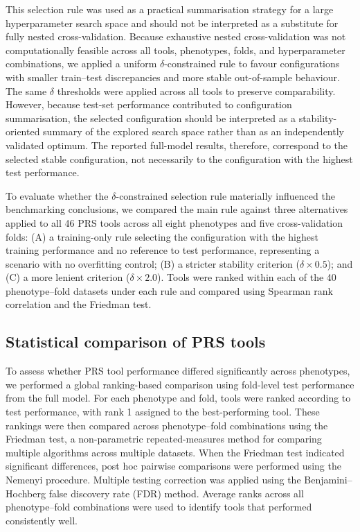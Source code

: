 \documentclass[pdflatex,sn-basic]{sn-jnl}
\begin{document}
This selection rule was used as a practical summarisation strategy for a large hyperparameter search space and should not be interpreted as a substitute for fully nested cross-validation. Because exhaustive nested cross-validation was not computationally feasible across all tools, phenotypes, folds, and hyperparameter combinations, we applied a uniform $\delta$-constrained rule to favour configurations with smaller train--test discrepancies and more stable out-of-sample behaviour. The same $\delta$ thresholds were applied across all tools to preserve comparability. However, because test-set performance contributed to configuration summarisation, the selected configuration should be interpreted as a stability-oriented summary of the explored search space rather than as an independently validated optimum. The reported full-model results, therefore, correspond to the selected stable configuration, not necessarily to the configuration with the highest test performance. 

To evaluate whether the $\delta$-constrained selection rule materially influenced the benchmarking conclusions, we compared the main rule against three alternatives applied to all 46 PRS tools across all eight phenotypes and five cross-validation folds: (A) a training-only rule selecting the configuration with the highest training performance and no reference to test performance, representing a scenario with no overfitting control; (B) a stricter stability criterion ($\delta \times 0.5$); and (C) a more lenient criterion ($\delta \times 2.0$). Tools were ranked within each of the 40 phenotype--fold datasets under each rule and compared using Spearman rank correlation and the Friedman test.


\subsection*{Statistical comparison of PRS tools}

To assess whether PRS tool performance differed significantly across phenotypes, we performed a global ranking-based comparison using fold-level test performance from the full model. For each phenotype and fold, tools were ranked according to test performance, with rank 1 assigned to the best-performing tool. These rankings were then compared across phenotype--fold combinations using the Friedman test, a non-parametric repeated-measures method for comparing multiple algorithms across multiple datasets. When the Friedman test indicated significant differences, post hoc pairwise comparisons were performed using the Nemenyi procedure. Multiple testing correction was applied using the Benjamini--Hochberg false discovery rate (FDR) method. Average ranks across all phenotype--fold combinations were used to identify tools that performed consistently well. 
\end{document}
